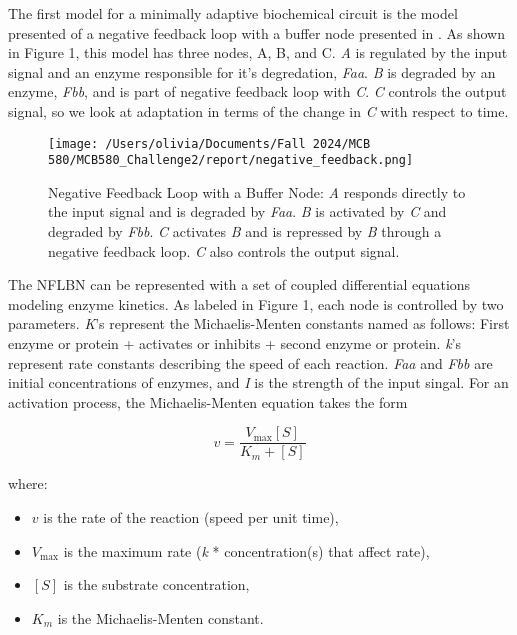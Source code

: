 \documentclass{article}
\begin{document}
The first model for a minimally adaptive biochemical circuit is the model presented of a negative feedback loop with a buffer node presented in \cite{challenge2paperD2L}. As shown in Figure 1, this model has three nodes, A, B, and C. \textit{A} is regulated by the input signal and an enzyme responsible for it's degredation, \textit{Faa}. \textit{B} is degraded by an enzyme, \textit{Fbb}, and is part of negative feedback loop with \textit{C}. \textit{C} controls the output signal, so we look at adaptation in terms of the change in \textit{C} with respect to time.   

\begin{figure}[H]
    \centering
    \texttt{[image: /Users/olivia/Documents/Fall 2024/MCB 580/MCB580\_Challenge2/report/negative\_feedback.png]}
    \caption{Negative Feedback Loop with a Buffer Node: \textit{A} responds directly to the input signal and is degraded by \textit{Faa}. \textit{B} is activated by \textit{C} and degraded by \textit{Fbb}. \textit{C} activates \textit{B} and is repressed by \textit{B} through a negative feedback loop. \textit{C} also controls the output signal.}
    \label{fig:1}
\end{figure}

The NFLBN can be represented with a set of coupled differential equations modeling enzyme kinetics. As labeled in Figure 1, each node is controlled by two parameters. \textit{K}'s represent the Michaelis-Menten constants named as follows: First enzyme or protein + activates or inhibits + second enzyme or protein. \textit{k}'s represent rate constants describing the speed of each reaction. \textit{Faa} and \textit{Fbb} are initial concentrations of enzymes, and \textit{I} is the strength of the input singal. For an activation process, the Michaelis-Menten equation takes the form 

\[
v = \frac{V_{\max} [S]}{K_m + [S]}
\]


where:
\begin{itemize}
    \item \(v\) is the rate of the reaction (speed per unit time), 
    \item \(V_{\max}\) is the maximum rate (\textit{k} * concentration(s) that affect rate),
    \item \([S]\) is the substrate concentration,
    \item \(K_m\) is the Michaelis-Menten constant.
\end{itemize}
\end{document}
